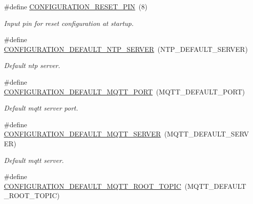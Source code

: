 \begin{DoxyCompactItemize}
\mbox{\label{rmap-config_8h_ae90da4786d4ba14563681879dba4d39c}} 
\#define \hyperlink{rmap-config_8h_ae90da4786d4ba14563681879dba4d39c}{C\+O\+N\+F\+I\+G\+U\+R\+A\+T\+I\+O\+N\+\_\+\+R\+E\+S\+E\+T\+\_\+\+P\+IN}~(8)
\begin{DoxyCompactList}\small\item\em Input pin for reset configuration at startup. \end{DoxyCompactList}\item 
\mbox{\label{rmap-config_8h_ad5f167ef5dab674e29cea328f672e0a3}} 
\#define \hyperlink{rmap-config_8h_ad5f167ef5dab674e29cea328f672e0a3}{C\+O\+N\+F\+I\+G\+U\+R\+A\+T\+I\+O\+N\+\_\+\+D\+E\+F\+A\+U\+L\+T\+\_\+\+N\+T\+P\+\_\+\+S\+E\+R\+V\+ER}~(N\+T\+P\+\_\+\+D\+E\+F\+A\+U\+L\+T\+\_\+\+S\+E\+R\+V\+ER)
\begin{DoxyCompactList}\small\item\em Default ntp server. \end{DoxyCompactList}\item 
\mbox{\label{rmap-config_8h_ab59fe331bcb2ec0b4c3abd6b13dc8c03}} 
\#define \hyperlink{rmap-config_8h_ab59fe331bcb2ec0b4c3abd6b13dc8c03}{C\+O\+N\+F\+I\+G\+U\+R\+A\+T\+I\+O\+N\+\_\+\+D\+E\+F\+A\+U\+L\+T\+\_\+\+M\+Q\+T\+T\+\_\+\+P\+O\+RT}~(M\+Q\+T\+T\+\_\+\+D\+E\+F\+A\+U\+L\+T\+\_\+\+P\+O\+RT)
\begin{DoxyCompactList}\small\item\em Default mqtt server port. \end{DoxyCompactList}\item 
\mbox{\label{rmap-config_8h_aec48aba6054d0eab8b9d9fb857f2a33c}} 
\#define \hyperlink{rmap-config_8h_aec48aba6054d0eab8b9d9fb857f2a33c}{C\+O\+N\+F\+I\+G\+U\+R\+A\+T\+I\+O\+N\+\_\+\+D\+E\+F\+A\+U\+L\+T\+\_\+\+M\+Q\+T\+T\+\_\+\+S\+E\+R\+V\+ER}~(M\+Q\+T\+T\+\_\+\+D\+E\+F\+A\+U\+L\+T\+\_\+\+S\+E\+R\+V\+ER)
\begin{DoxyCompactList}\small\item\em Default mqtt server. \end{DoxyCompactList}\item 
\mbox{\label{rmap-config_8h_a85521de6b08f8704bd35a8e34edef4f8}} 
\#define \hyperlink{rmap-config_8h_a85521de6b08f8704bd35a8e34edef4f8}{C\+O\+N\+F\+I\+G\+U\+R\+A\+T\+I\+O\+N\+\_\+\+D\+E\+F\+A\+U\+L\+T\+\_\+\+M\+Q\+T\+T\+\_\+\+R\+O\+O\+T\+\_\+\+T\+O\+P\+IC}~(M\+Q\+T\+T\+\_\+\+D\+E\+F\+A\+U\+L\+T\+\_\+\+R\+O\+O\+T\+\_\+\+T\+O\+P\+IC)

\end{DoxyCompactItemize}
